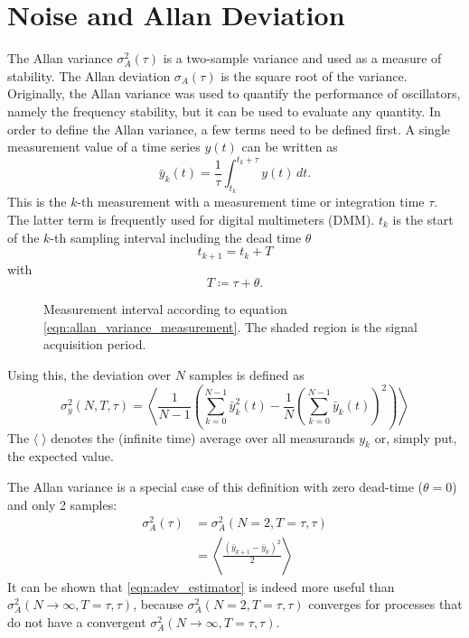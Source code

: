 \section{Noise and Allan Deviation}%
\label{sec:allan_deviation}
The Allan variance \cite{adev} $\sigma_A^2(\tau)$ is a two-sample variance and used as a measure of stability. The Allan deviation $\sigma_A(\tau)$ is the square root of the variance. Originally, the Allan variance was used to quantify the performance of oscillators, namely the frequency stability, but it can be used to evaluate any quantity. In order to define the Allan variance, a few terms need to be defined first. A single measurement value of a time series $y(t)$ can be written as
\begin{equation}
    \bar y_k(t) = \frac{1}{\tau} \int_{t_{k}}^{t_{k}+\tau} y(t)\,dt . \label{eqn:allan_variance_measurement}
\end{equation}
This is the $k$-th measurement with a measurement time or integration time $\tau$. The latter term is frequently used for digital multimeters (DMM). $t_k$ is the start of the $k$-th sampling interval including the dead time $\theta$
\begin{equation}
    t_{k+1} = t_k + T
\end{equation}
with
\begin{equation}
    T \coloneqq \tau + \theta .
\end{equation}

\begin{figure}[hb]
    \centering
    \caption{Measurement interval according to equation \ref{eqn:allan_variance_measurement}. The shaded region is the signal acquisition period.}
    \label{fig:allan_variance_definitions}
\end{figure}

Using this, the deviation over $N$ samples is defined as \cite{adev,psd_to_adev}
\begin{equation}
    \sigma_y^2(N,T,\tau) = \left\langle \frac{1}{N-1} \left(\sum _{k=0}^{N-1}\bar y_k^2(t)-\frac{1}{N}\left(\sum _{k=0}^{N-1} \bar y_k(t)\right)^2\right)\right\rangle
\end{equation}
The $\langle \; \rangle$ denotes the (infinite time) average over all measurands $y_k$ or, simply put, the expected value.

The Allan variance is a special case of this definition with zero dead-time ($\theta=0$) and only 2 samples:
\begin{align}
    \sigma_A^2(\tau) &= \sigma_A^2(N=2,T=\tau,\tau) \label{eqn:allan_coefficients}\\
    &= \left\langle \frac{\left(\bar y_{k+1} - \bar y_k \right)^2}{2} \right\rangle
\end{align}
It can be shown \cite{psd_to_adev} that \ref{eqn:adev_estimator} is indeed more useful than $\sigma_A^2(N\to\infty,T=\tau,\tau)$, because $\sigma_A^2(N=2,T=\tau,\tau)$ converges for processes that do not have a convergent $\sigma_A^2(N\to\infty,T=\tau,\tau)$.

